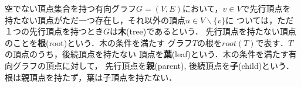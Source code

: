 \documentclass[a4j,dvipdfmx]{jbook}
\begin{document}
空でない頂点集合を持つ有向グラフ$G=(V,E)$において，$v\in V$で先行頂点を
持たない頂点がただ一つ存在し，それ以外の頂点$u\in V\backslash\{v\}$に
ついては，ただ１つの先行頂点を持つとき$G$は{\bf 木}(tree)であるという．
先行頂点を持たない頂点のことを{\bf 根}(root)という．木の条件を満たす
グラフ$T$の根を$root(T)$で表す．$T$の頂点のうち，後続頂点を持たない
頂点を{\bf 葉}(leaf)という．木の条件を満たす有向グラフの頂点に対して，
先行頂点を{\bf 親}(parent), 後続頂点を{\bf 子}(child)という．
根は親頂点を持たず，葉は子頂点を持たない．
\end{document}

